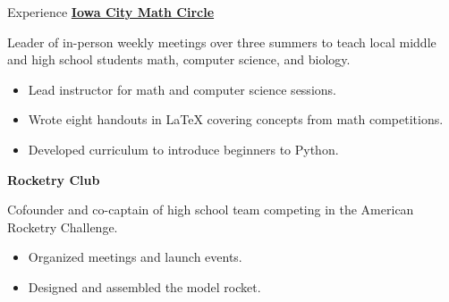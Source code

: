 \begin{rubric}{Experience}
\entry*[2021-present] \textbf{\href{https://iowacitymathcircle.org}{Iowa City Math Circle}} 
    \par Leader of in-person weekly meetings over three summers to teach local middle and high school students math, computer science, and biology. 
    \begin{itemize}
        \item Lead instructor for math and computer science sessions.
        \item Wrote eight handouts in LaTeX covering concepts from math competitions. 
        \item Developed curriculum to introduce beginners to Python.
    \end{itemize}
\entry*[2021-present] \textbf{Rocketry Club}
    \par Cofounder and co-captain of high school team competing in the American Rocketry Challenge. 
    \begin{itemize}
        \item Organized meetings and launch events. 
        \item Designed and assembled the model rocket.
    \end{itemize}
\end{rubric}